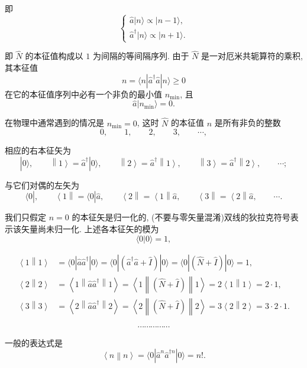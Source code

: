 即
\[
\begin{cases}
\hat{a}|n\rangle \propto |n-1\rangle, \\
\hat{a}^{\dagger}|n\rangle \propto |n+1\rangle.
\end{cases}
\]

即 $\hat{N}$ 的本征值构成以 $1$ 为间隔的等间隔序列.
由于 $\hat{N}$ 是一对厄米共轭算符的乘积, 其本征值
\[
n=\langle n|\hat{a}^{\dagger}\hat{a}|n\rangle \geq 0
\]
在它的本征值序列中必有一个非负的最小值
$n_{\min}$, 且
\[
\hat{a}|n_{\min}\rangle=0.
\]

在物理中通常遇到的情况是 $n_{\min}=0$,
这时 $\hat{N}$ 的本征值 $n$ 是所有非负的整数
\[
0, \qquad 1, \qquad 2, \qquad 3, \qquad \cdots,
\]

相应的右本征矢为
\[
|0\rangle, \qquad
\left\|1\right\rangle=\hat{a}^{\dagger}|0\rangle, \qquad
\left\|2\right\rangle=\hat{a}^{\dagger}\left\|1\right\rangle, \qquad
\left\|3\right\rangle=\hat{a}^{\dagger}\left\|2\right\rangle, \qquad
\cdots;
\]

与它们对偶的左矢为
\[
\langle 0|, \qquad
\left\langle 1\right\|=\langle 0|\hat{a}, \qquad
\left\langle 2\right\|=\left\langle 1\right\|\hat{a}, \qquad
\left\langle 3\right\|=\left\langle 2\right\|\hat{a}, \qquad
\cdots.
\]

我们只假定 $n=0$ 的本征矢是归一化的, (不要与零矢量混淆)双线的狄拉克符号表示该矢量尚未归一化.
上述各本征矢的模为
\[
\langle 0|0\rangle=1,
\]

\[
\begin{aligned}
\left\langle 1\middle\|1\right\rangle
&=
\langle 0|\hat{a}\hat{a}^{\dagger}|0\rangle
=
\langle 0|(\hat{a}^{\dagger}\hat{a}+\hat{I})|0\rangle
=
\langle 0|(\hat{N}+\hat{I})|0\rangle
=1, \\
\left\langle 2\middle\|2\right\rangle
&=
\left\langle 1\middle\|\hat{a}\hat{a}^{\dagger}\middle\|1\right\rangle
=
\left\langle 1\middle\|(\hat{N}+\hat{I})\middle\|1\right\rangle
=
2\left\langle 1\middle\|1\right\rangle
=2\cdot 1, \\
\left\langle 3\middle\|3\right\rangle
&=
\left\langle 2\middle\|\hat{a}\hat{a}^{\dagger}\middle\|2\right\rangle
=
\left\langle 2\middle\|(\hat{N}+\hat{I})\middle\|2\right\rangle
=
3\left\langle 2\middle\|2\right\rangle
=3\cdot 2\cdot 1.
\end{aligned}
\]

\[
\cdots\cdots\cdots\cdots\cdots
\]

一般的表达式是
\[
\left\langle n\middle\|n\right\rangle
=
\langle 0|\hat{a}^{n}\hat{a}^{\dagger n}|0\rangle
=
n!.
\]


